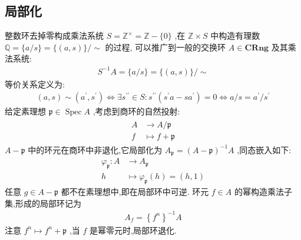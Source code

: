 \subsection{局部化}
整数环去掉零构成乘法系统 $S=\mathbb{Z}^{\times}=\mathbb{Z}-\{0\}$ ,在 $\mathbb{Z} \times S$ 中构造有理数 $\mathbb{Q}=\{a / s\}=\{(a, s)\} / \sim$ 的过程, 可以推广到一般的交换环 $A \in \mathbf{C R n g}$ 及其乘法系统:
\begin{align*}
S^{-1} A=\{a / s\}=\{(a, s)\} / \sim
\end{align*}
等价关系定义为:
\begin{align*}
(a, s) \sim\left(a^{\prime}, s^{\prime}\right) \Longleftrightarrow \exists s^{\prime \prime} \in S: s^{\prime \prime}\left(s^{\prime} a-s a^{\prime}\right)=0 \Longleftrightarrow a / s=a^{\prime} / s^{\prime}
\end{align*}
给定素理想 $\mathfrak{p} \in \operatorname{Spec} A$ ,考虑到商环的自然投射:
\begin{align*}
\begin{aligned}
A & \rightarrow A / \mathfrak{p} \\
f & \mapsto f+\mathfrak{p}
\end{aligned}
\end{align*}
$A-\mathfrak{p}$ 中的环元在商环中非退化,它局部化为 $A_{\mathfrak{p}}=(A-\mathfrak{p})^{-1} A$ ,同态嵌入如下:
\begin{align*}
\varphi_{\mathfrak{p}}: A &\rightarrow A_{\mathfrak{p}}\\ 
h &\mapsto \varphi_{\mathfrak{p}}(h)=(h,1)
\end{align*}
任意 $g \in A-\mathfrak{p}$ 都不在素理想中,即在局部环中可逆.
环元 $f \in A$ 的幂构造乘法子集,形成的局部环记为
\begin{align*}
A_f=\left\{f^n\right\}^{-1} A
\end{align*}
注意 $f^n \mapsto f^n+\mathfrak{p}$ ,当 $f$ 是幂零元时,局部环退化.
